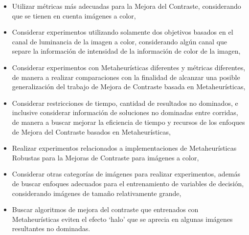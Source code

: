 \begin{itemize}
	\item Utilizar métricas más adecuadas para la Mejora del Contraste, considerando que se tienen en cuenta imágenes a color,

	\item Considerar experimentos utilizando solamente dos objetivos basados en el canal de luminancia de la imagen a color, considerando algún canal que separe la información de intensidad de la información de color de la imagen,

	\item Considerar experimentos con Metaheurísticas diferentes y métricas diferentes, de manera a realizar comparaciones con la finalidad de alcanzar una posible generalización del trabajo de Mejora de Contraste basada en Metaheurísticas,

	\item Considerar restricciones de tiempo, cantidad de resultados no dominados, e inclusive considerar información de soluciones no dominadas entre corridas, de manera a buscar mejorar la eficiencia de tiempo y recursos de los enfoques de Mejora del Contraste basados en Metaheurísticas,

	\item Realizar experimentos relacionados a implementaciones de Metaheurísticas Robustas para la Mejoras de Contraste para imágenes a color,

	\item Considerar otras categorías de imágenes para realizar experimentos, además de buscar enfoques adecuados para el entrenamiento de variables de decisión, considerando imágenes de tamaño relativamente grande,

	\item Buscar algoritmos de mejora del contraste que entrenados con Metaheurísticas eviten el efecto `halo' que se aprecia en algunas imágenes resultantes no dominadas.

\end{itemize}


	
	
